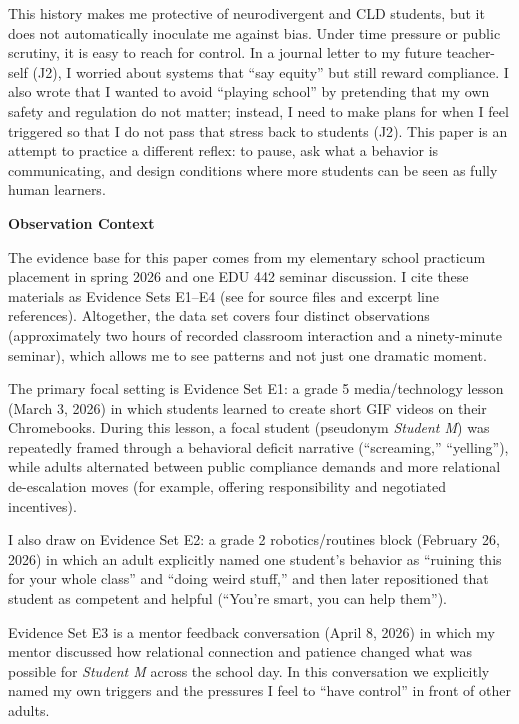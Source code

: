 \documentclass[12pt]{article}
\newcommand{\apaheading}[1]{\begin{center}\textbf{#1}\end{center}}
\newcommand{\EvidenceSet}[1]{\textsc{E#1}}
\newcommand{\JournalArtifact}[1]{\textsc{J#1}}
\begin{document}
This history makes me protective of neurodivergent and CLD students, but it does not automatically inoculate me against bias. Under time pressure or public scrutiny, it is easy to reach for control. In a journal letter to my future teacher-self (\JournalArtifact{2}), I worried about systems that ``say equity'' but still reward compliance. I also wrote that I wanted to avoid ``playing school'' by pretending that my own safety and regulation do not matter; instead, I need to make plans for when I feel triggered so that I do not pass that stress back to students (\JournalArtifact{2}). This paper is an attempt to practice a different reflex: to pause, ask what a behavior is communicating, and design conditions where more students can be seen as fully human learners.

\apaheading{Observation Context}

The evidence base for this paper comes from my elementary school practicum placement in spring 2026 and one EDU 442 seminar discussion. I cite these materials as Evidence Sets \EvidenceSet{1}--\EvidenceSet{4} (see  for source files and excerpt line references). Altogether, the data set covers four distinct observations (approximately two hours of recorded classroom interaction and a ninety-minute seminar), which allows me to see patterns and not just one dramatic moment.

The primary focal setting is Evidence Set \EvidenceSet{1}: a grade 5 media/technology lesson (March 3, 2026) in which students learned to create short GIF videos on their Chromebooks. During this lesson, a focal student (pseudonym \textit{Student M}) was repeatedly framed through a behavioral deficit narrative (``screaming,'' ``yelling''), while adults alternated between public compliance demands and more relational de-escalation moves (for example, offering responsibility and negotiated incentives).

I also draw on Evidence Set \EvidenceSet{2}: a grade 2 robotics/routines block (February 26, 2026) in which an adult explicitly named one student's behavior as ``ruining this for your whole class'' and ``doing weird stuff,'' and then later repositioned that student as competent and helpful (``You're smart, you can help them'').

Evidence Set \EvidenceSet{3} is a mentor feedback conversation (April 8, 2026) in which my mentor discussed how relational connection and patience changed what was possible for \textit{Student M} across the school day. In this conversation we explicitly named my own triggers and the pressures I feel to ``have control'' in front of other adults.
\end{document}
